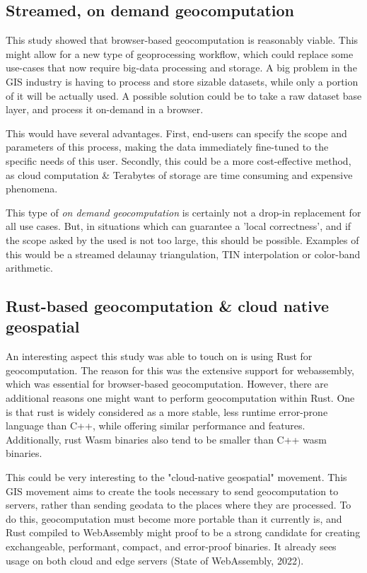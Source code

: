 \subsection{Streamed, on demand geocomputation}

This study showed that browser-based geocomputation is reasonably viable. 
This might allow for a new type of geoprocessing workflow, which could replace some use-cases that now require big-data processing and storage.
A big problem in the \ac{GIS} industry is having to process and store sizable datasets, while only a portion of it will be actually used. 
A possible solution could be to take a raw dataset base layer, and process it on-demand in a browser.

This would have several advantages. 
First, end-users can specify the scope and parameters of this process, making the data immediately fine-tuned to the specific needs of this user. 
Secondly, this could be a more cost-effective method, as cloud computation \& Terabytes of storage are time consuming and expensive phenomena.

This type of \emph{on demand geocomputation} is certainly not a drop-in replacement for all use cases. 
But, in situations which can guarantee a 'local correctness', and if the scope asked by the used is not too large, this should be possible. 
Examples of this would be a streamed delaunay triangulation, TIN interpolation or color-band arithmetic. 

\subsection{Rust-based geocomputation \& cloud native geospatial}

An interesting aspect this study was able to touch on is using Rust for geocomputation.
The reason for this was the extensive support for webassembly, which was essential for browser-based geocomputation. 
However, there are additional reasons one might want to perform geocomputation within Rust.
One is that rust is widely considered as a more stable, less runtime error-prone language than C++, while offering similar performance and features.
Additionally, rust Wasm binaries also tend to be smaller than C++ wasm binaries.  

This could be very interesting to the "cloud-native geospatial" movement. 
This \ac{GIS} movement aims to create the tools necessary to send geocomputation to servers, rather than sending geodata to the places where they are processed.
To do this, geocomputation must become more portable than it currently is, and Rust compiled to WebAssembly might proof to be a strong candidate for creating exchangeable, performant, compact, and error-proof binaries.
It already sees usage on both cloud and edge servers (State of WebAssembly, 2022).  

